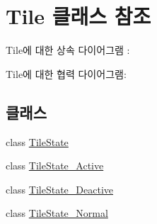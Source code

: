 \hypertarget{class_tile}{}\section{Tile 클래스 참조}
\label{class_tile}


Tile에 대한 상속 다이어그램 \+: 


Tile에 대한 협력 다이어그램\+:
\subsection*{클래스}
\begin{DoxyCompactItemize}
\item 
class \hyperlink{class_tile_1_1_tile_state}{Tile\+State}
\item 
class \hyperlink{class_tile_1_1_tile_state___active}{Tile\+State\+\_\+\+Active}
\item 
class \hyperlink{class_tile_1_1_tile_state___deactive}{Tile\+State\+\_\+\+Deactive}
\item 
class \hyperlink{class_tile_1_1_tile_state___normal}{Tile\+State\+\_\+\+Normal}
\end{DoxyCompactItemize}
